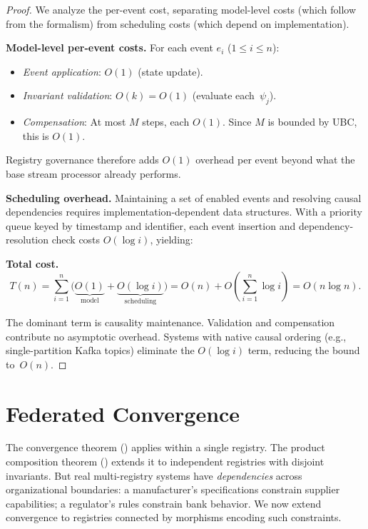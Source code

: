 \documentclass[11pt,a4paper]{article}
\theoremstyle{plain}
\theoremstyle{definition}
\theoremstyle{remark}
\renewcommand{\_}{\textunderscore\allowbreak}
\begin{document}
\begin{proof}
We analyze the per-event cost, separating model-level costs (which follow from
the formalism) from scheduling costs (which depend on implementation).

\textbf{Model-level per-event costs.}  For each event $e_i$
($1 \leq i \leq n$):
\begin{itemize}[leftmargin=*,nosep]
\item \emph{Event application}: $O(1)$ (state update).
\item \emph{Invariant validation}: $O(k) = O(1)$ (evaluate each~$\psi_j$).
\item \emph{Compensation}: At most $M$ steps, each $O(1)$.  Since $M$ is
  bounded by UBC, this is $O(1)$.
\end{itemize}
Registry governance therefore adds $O(1)$ overhead per event beyond what the
base stream processor already performs.

\textbf{Scheduling overhead.}  Maintaining a set of enabled events and
resolving causal dependencies requires implementation-dependent data
structures.  With a priority queue keyed by timestamp and identifier, each
event insertion and dependency-resolution check costs $O(\log i)$, yielding:

\textbf{Total cost.}
\[
T(n) = \sum_{i=1}^n \bigl(\underbrace{O(1)}_{\text{model}} +
  \underbrace{O(\log i)}_{\text{scheduling}}\bigr)
     = O(n) + O\!\left(\sum_{i=1}^n \log i\right)
     = O(n \log n).
\]

The dominant term is causality maintenance.  Validation and compensation
contribute no asymptotic overhead.  Systems with native causal ordering (e.g.,
single-partition Kafka topics) eliminate the $O(\log i)$ term, reducing the
bound to~$O(n)$.
\end{proof}

\section{Federated Convergence}
\label{sec:federation}

The convergence theorem () applies within a single
registry.  The product composition theorem () extends it
to independent registries with disjoint invariants.  But real multi-registry
systems have \emph{dependencies} across organizational boundaries: a
manufacturer's specifications constrain supplier capabilities; a regulator's
rules constrain bank behavior.  We now extend convergence to registries
connected by morphisms encoding such constraints.
\end{document}
